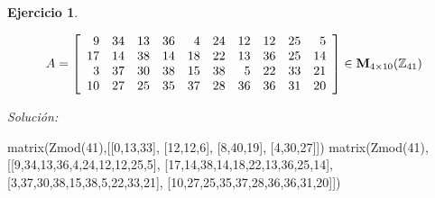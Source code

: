 \documentclass[12pt]{amsart}
\newtheorem{ejer}{Ejercicio}
\begin{document}
\begin{ejer}
\begin{minipage}{\textwidth}
\begin{tcolorbox}[colback = red!20!white,title=Versión Ecuaciones Implícitas]
\end{tcolorbox}
\end{minipage}
\[ A = \left[\begin{array}{rrrrrrrrrr}
9 & 34 & 13 & 36 & 4 & 24 & 12 & 12 & 25 & 5 \\
17 & 14 & 38 & 14 & 18 & 22 & 13 & 36 & 25 & 14 \\
3 & 37 & 30 & 38 & 15 & 38 & 5 & 22 & 33 & 21 \\
10 & 27 & 25 & 35 & 37 & 28 & 36 & 36 & 31 & 20
\end{array}\right] \in {\bf M}_{4\times 10}({\mathbb Z}_{41})\]
\end{ejer}

{\it Soluci\'on:}

\begin{sageblock}
matrix(Zmod(41),[[0,13,33],
[12,12,6],
[8,40,19],
[4,30,27]])
matrix(Zmod(41),[[9,34,13,36,4,24,12,12,25,5],
[17,14,38,14,18,22,13,36,25,14],
[3,37,30,38,15,38,5,22,33,21],
[10,27,25,35,37,28,36,36,31,20]])
\end{sageblock}

\end{document}
